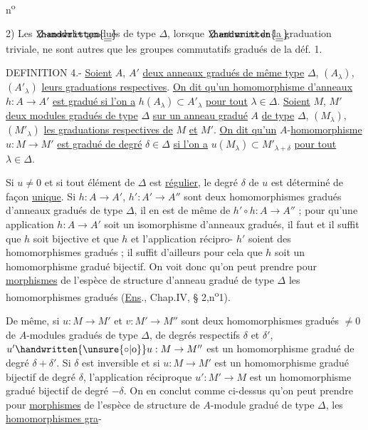 \begin{flushright}
n\textsuperscript{o}
\end{flushright}

2) Les $\rlap{\ensuremath{\handwritten{\underline{\underline{\phantom{Z}}}}}}Z$-modules gradués de type $\Delta$, lorsque $\rlap{\ensuremath{\handwritten{\underline{\underline{\phantom{Z}}}}}}Z$ est muni de la graduation triviale, ne sont autres que les groupes commutatifs gradués de la déf. 1.

DEFINITION 4.- \uline{Soient} $A$, $A'$ \uline{deux anneaux gradués de même type} $\Delta$, $(A_\lambda)$, $(A'_\lambda)$ \uline{leurs graduations respectives}. \uline{On dit qu'un homomorphisme d'anneaux} $h:A\to A'$ \uline{est gradué si l'on a} $h(A_\lambda)\subset A'_\lambda$ \uline{pour tout} $\lambda\in\Delta$. \uline{Soient} $M$, $M'$ \uline{deux modules gradués de type} $\Delta$ \uline{sur un anneau gradué} $A$ \uline{de type} $\Delta$, $(M_\lambda)$, $(M'_\lambda)$ \uline{les graduations respectives de} $M$ \uline{et} $M'$. \uline{On dit qu'un} $A$-\uline{homomorphisme} $u:M\to M'$ \uline{est gradué de degré} $\delta\in\Delta$ \uline{si l'on a} $u(M_\lambda)\subset M'_{\lambda+\delta}$ \uline{pour tout} $\lambda\in\Delta$.

Si $u\ne 0$ et si tout élément de $\Delta$ est \uline{régulier}, le degré $\delta$ de $u$ est déterminé de façon \uline{unique}. Si $h:A\to A'$, $h':A'\to A''$ sont deux homomorphismes gradués d'anneaux gradués de type $\Delta$, il en est de même de $h'\circ h:A\to A''$ ; pour qu'une application $h:A\to A'$ soit un isomorphisme d'anneaux gradués, il faut et il suffit que $h$ soit bijective et que $h$ et l'application récipro- $h'$ soient des homomorphismes gradués ; il suffit d'ailleurs pour cela que $h$ soit un homomorphisme gradué bijectif. On voit donc qu'on peut prendre pour \uline{morphismes} de l'espèce de structure d'anneau gradué de type $\Delta$ les homomorphismes gradués (\uline{Ens}., Chap.IV, \S{} 2,n\textsuperscript{o}1).

De même, si $u:M\to M'$ et $v:M'\to M''$ sont deux homomorphismes gradués $\ne 0$ de $A$-modules gradués de type $\Delta$, de degrés respectifs $\delta$ et $\delta'$, $u'\handwritten{\unsure{\circ|\mathrm{o}}}u:M\to M''$ est un homomorphisme gradué de degré $\delta+\delta'$. Si $\delta$ est inversible et si $u:M\to M'$ est un homomorphisme gradué bijectif de degré $\delta$, l'application réciproque $u':M'\to M$ est un homomorphisme gradué bijectif de degré $-\delta$. On en conclut comme ci-dessus qu'on peut prendre pour \uline{morphismes} de l'espèce de structure de $A$-module gradué de type $\Delta$, les \uline{homomorphismes gra}-

